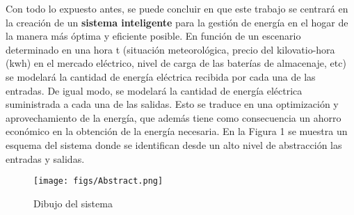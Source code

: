 Con todo lo expuesto antes, se puede concluir en que este trabajo se centrará en la creación de un \textbf{sistema inteligente} para la gestión de energía en el hogar de la manera más óptima y eficiente posible. En función de un escenario determinado en una hora t (situación meteorológica, precio del kilovatio-hora (kwh) en el mercado eléctrico, nivel de carga de las baterías de almacenaje, etc) se modelará la cantidad de energía eléctrica recibida por cada una de las entradas. De igual modo, se modelará la cantidad de energía eléctrica suministrada a cada una de las salidas. Esto se traduce en una optimización y aprovechamiento de la energía, que además tiene como consecuencia un ahorro económico en la obtención de la energía necesaria.
En la Figura 1 se muestra un esquema del sistema donde se identifican desde un alto nivel de abstracción las entradas y salidas.\\

\begin{figure}[!h]
	\centering
	\texttt{[image: figs/Abstract.png]}
	\caption{Dibujo del sistema}
\end{figure}

